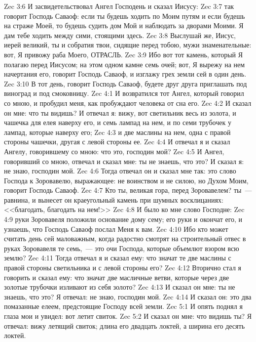 \vs Zec 3:6 И засвидетельствовал Ангел Господень и сказал Иисусу:
\vs Zec 3:7 так говорит Господь Саваоф: если ты будешь ходить по Моим путям и если будешь на страже Моей, то будешь судить дом Мой и наблюдать за дворами Моими. Я дам тебе ходить между сими, стоящими здесь.
\vs Zec 3:8 Выслушай же, Иисус, иерей великий, ты и собратия твои, сидящие перед тобою, мужи знаменательные: вот, Я привожу раба Моего, ОТРАСЛЬ.
\vs Zec 3:9 Ибо вот тот камень, который Я полагаю перед Иисусом; на этом одном камне семь очей; вот, Я вырежу на нем начертания его, говорит Господь Саваоф, и изглажу грех земли сей в один день.
\vs Zec 3:10 В тот день, говорит Господь Саваоф, будете друг друга приглашать под виноград и под смоковницу.
\vs Zec 4:1 И возвратился тот Ангел, который говорил со мною, и пробудил меня, как пробуждают человека от сна его.
\vs Zec 4:2 И сказал он мне: что ты видишь? И отвечал я: вижу, вот светильник весь из золота, и чашечка для елея наверху его, и семь лампад на нем, и по семи трубочек у лампад, которые наверху его;
\vs Zec 4:3 и две маслины на нем, одна с правой стороны чашечки, другая с левой стороны ее.
\vs Zec 4:4 И отвечал я и сказал Ангелу, говорившему со мною: что это, господин мой?
\vs Zec 4:5 И Ангел, говоривший со мною, отвечал и сказал мне: ты не знаешь, что это? И сказал я: не знаю, господин мой.
\vs Zec 4:6 Тогда отвечал он и сказал мне так: это слово Господа к Зоровавелю, выражающее: не воинством и не силою, но Духом Моим, говорит Господь Саваоф.
\vs Zec 4:7 Кто ты, великая гора, перед Зоровавелем? ты~--- равнина, и вынесет он краеугольный камень при шумных восклицаниях: <<благодать, благодать на нем!>>
\vs Zec 4:8 И было ко мне слово Господне:
\vs Zec 4:9 руки Зоровавеля положили основание дому сему; его руки и окончат его, и узнаешь, что Господь Саваоф послал Меня к вам.
\vs Zec 4:10 Ибо кто может считать день сей маловажным, когда радостно смотрят на строительный отвес в руках Зоровавеля те семь,~--- это очи Господа, которые объемлют взором всю землю?
\vs Zec 4:11 Тогда отвечал я и сказал ему: что значат те две маслины с правой стороны светильника и с левой стороны его?
\vs Zec 4:12 Вторично стал я говорить и сказал ему: что значат две масличные ветви, которые через две золотые трубочки изливают из себя золото?
\vs Zec 4:13 И сказал он мне: ты не знаешь, что это? Я отвечал: не знаю, господин мой.
\vs Zec 4:14 И сказал он: это два помазанные елеем, предстоящие Господу всей земли.
\vs Zec 5:1 И опять поднял я глаза мои и увидел: вот летит свиток.
\vs Zec 5:2 И сказал он мне: что видишь ты? Я отвечал: вижу летящий свиток; длина его двадцать локтей, а ширина его десять локтей.
